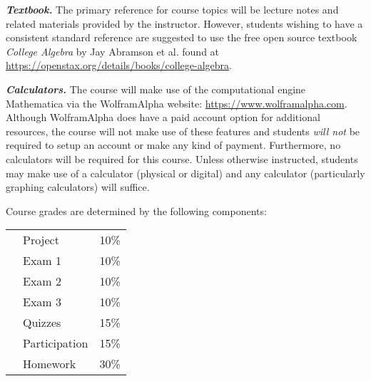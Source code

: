 \documentclass[11pt,letterpaper]{article}
\begin{document}
{\itshape\bfseries\color{stacred}Textbook.} The primary reference for course topics will be lecture notes and related materials provided by the instructor. However, students wishing to have a consistent standard reference are suggested to use the free open source textbook \textit{College Algebra} by Jay Abramson et al. found at \url{https://openstax.org/details/books/college-algebra}. \pspace

{\itshape\bfseries\color{stacred}Calculators.} The course will make use of the computational engine Mathematica via the WolframAlpha website: \url{https://www.wolframalpha.com}. Although WolframAlpha does have a paid account option for additional resources, the course will not make use of these features and students {\itshape will not} be required to setup an account or make any kind of payment. Furthermore, no calculators will be required for this course. Unless otherwise instructed, students may make use of a calculator (physical or digital) and any calculator (particularly graphing calculators) will suffice. 
\sectionbreak









Course grades are determined by the following components: \par
	\begin{table}[!ht]
        \begin{tabular}{clr}
        & Project & 10\% \\
        & Exam 1 & 10\% \\
        & Exam 2 & 10\% \\
        & Exam 3 & 10\% \\
        & Quizzes & 15\% \\
        & Participation & 15\% \\
	& Homework & 30\%         
        \end{tabular} 
        \end{table}
\sectionbreak
\end{document}
